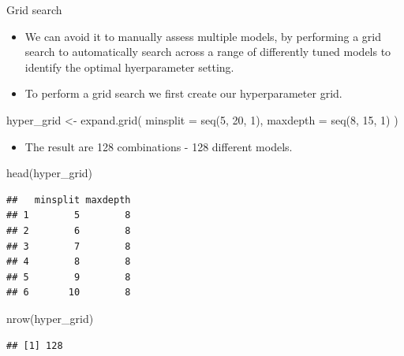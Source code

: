 \documentclass[
  10pt,
  ignorenonframetext,
]{beamer}
\newenvironment{Shaded}{}{}
\newcommand{\DataTypeTok}[1]{#1}
\newcommand{\DecValTok}[1]{#1}
\newcommand{\KeywordTok}[1]{\textcolor[rgb]{0.00,0.00,1.00}{#1}}
\newcommand{\NormalTok}[1]{#1}
\newcommand{\StringTok}[1]{\textcolor[rgb]{0.00,0.50,0.50}{#1}}
\providecommand{\tightlist}{%
  \setlength{\itemsep}{0pt}\setlength{\parskip}{0pt}}
\begin{document}
\begin{frame}[fragile]{Grid search}
\protect\hypertarget{grid-search}{}

\begin{itemize}
\tightlist
\item
  We can avoid it to manually assess multiple models, by performing a
  grid search to automatically search across a range of differently
  tuned models to identify the optimal hyerparameter setting.
\item
  To perform a grid search we first create our hyperparameter grid. 
\end{itemize}

\begin{Shaded}
\begin{Highlighting}[]
\NormalTok{hyper_grid <-}\StringTok{ }\KeywordTok{expand.grid}\NormalTok{(}
  \DataTypeTok{minsplit =} \KeywordTok{seq}\NormalTok{(}\DecValTok{5}\NormalTok{, }\DecValTok{20}\NormalTok{, }\DecValTok{1}\NormalTok{),}
  \DataTypeTok{maxdepth =} \KeywordTok{seq}\NormalTok{(}\DecValTok{8}\NormalTok{, }\DecValTok{15}\NormalTok{, }\DecValTok{1}\NormalTok{)}
\NormalTok{)}
\end{Highlighting}
\end{Shaded}

\begin{itemize}
\tightlist
\item
  The result are 128 combinations - 128 different models.
\end{itemize}

\begin{Shaded}
\begin{Highlighting}[]
\KeywordTok{head}\NormalTok{(hyper_grid)}
\end{Highlighting}
\end{Shaded}

\begin{verbatim}
##   minsplit maxdepth
## 1        5        8
## 2        6        8
## 3        7        8
## 4        8        8
## 5        9        8
## 6       10        8
\end{verbatim}

\begin{Shaded}
\begin{Highlighting}[]
\KeywordTok{nrow}\NormalTok{(hyper_grid)}
\end{Highlighting}
\end{Shaded}

\begin{verbatim}
## [1] 128
\end{verbatim}

\end{frame}
\end{document}
